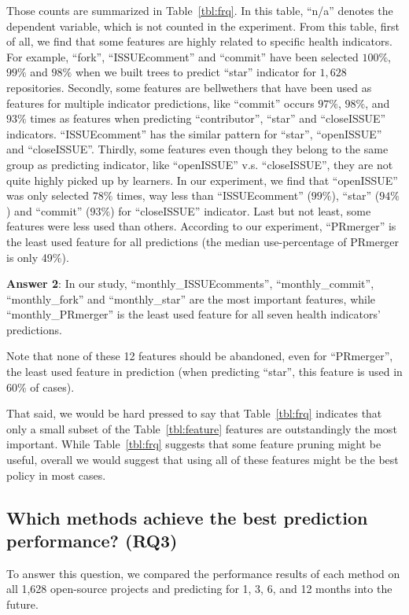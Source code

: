 \documentclass[sigconf,review,anonymous]{acmart}
\newcommand{\tbl}[1]{Table~\ref{tbl:#1}}
\begin{document}
Those counts are summarized in  Table~\ref{tbl:frq}. In this table, ``n/a''  denotes the dependent variable, which is not counted in the experiment. From this table, first of all, we find that some features are highly related to specific health indicators. For example, ``fork'', ``ISSUEcomment'' and  ``commit'' have been selected  $100\%$,  $99\%$ and  $98\%$  when we built trees to predict ``star'' indicator for $1,628$ repositories.  Secondly, some features are bellwethers that have been used as features for multiple indicator predictions, like ``commit'' occurs $97\%$, $98\%$, and $93\%$ times as features when predicting ``contributor'', ``star'' and ``closeISSUE'' indicators. ``ISSUEcomment'' has the similar pattern for ``star'', ``openISSUE'' and ``closeISSUE''. Thirdly, some features even though they belong to the same group as predicting indicator, like ``openISSUE'' v.s. ``closeISSUE'', they are not quite highly picked up by learners. In our experiment, we find that  ``openISSUE'' was only selected $78\%$ times, way less than ``ISSUEcomment'' ($99\%$), ``star'' ($94\%$) and ``commit'' ($93\%$) for ``closeISSUE'' indicator. Last but not least,  some features were less used than others. According to our experiment, ``PRmerger'' is the least used feature for all predictions (the median use-percentage of PRmerger is only 49\%).


\begin{blockquote}
\noindent
\textbf{Answer 2}: In our study, ``monthly\_ISSUEcomments'', ``monthly\_commit'', ``monthly\_fork'' and ``monthly\_star'' are the most important features, while ``monthly\_PRmerger'' is the least used feature for all seven health indicators' predictions.
\end{blockquote}

Note that none of these 12 features should be abandoned, even for ``PRmerger'', the least used feature in prediction (when predicting ``star'', this feature is used in 60\% of cases).

 That said, we would be hard pressed to say
 that Table~\ref{tbl:frq} indicates that only a small subset of the \tbl{feature} features are outstandingly the  most important. While Table~\ref{tbl:frq} suggests that some feature pruning might be useful, overall we would suggest that using all of these features might be the best policy in most cases.



\subsection{Which methods achieve the best prediction performance? (RQ3)}
To answer this question, 
we compared the performance results of each method on all 1,628 open-source projects and predicting for 1, 3, 6, and 12 months into the future.  
\end{document}
